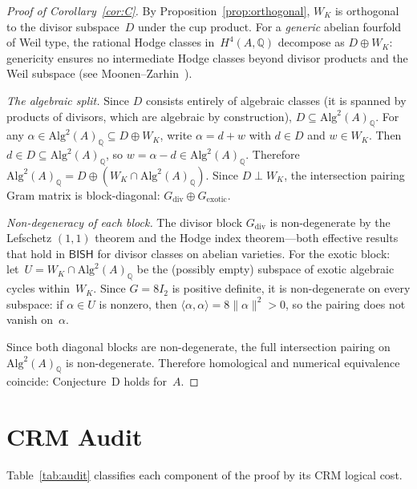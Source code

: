\documentclass[11pt]{article}
\theoremstyle{plain}
\theoremstyle{definition}
\theoremstyle{remark}
\newcommand{\Q}{\mathbb{Q}}
\newcommand{\BISH}{\mathsf{BISH}}
\begin{document}
\begin{proof}[Proof of Corollary~\ref{cor:C}]
By Proposition~\ref{prop:orthogonal}, $W_K$ is orthogonal to the divisor
subspace~$D$ under the cup product.  For a \emph{generic} abelian fourfold
of Weil type, the rational Hodge classes in~$H^4(A,\Q)$ decompose as
$D \oplus W_K$: genericity ensures no intermediate Hodge classes beyond
divisor products and the Weil subspace
(see Moonen--Zarhin~\cite{moonen-zarhin2000}).

\emph{The algebraic split.}
Since $D$ consists entirely of algebraic classes (it is spanned by products
of divisors, which are algebraic by construction), $D \subseteq
\text{Alg}^2(A)_\Q$.  For any $\alpha \in \text{Alg}^2(A)_\Q
\subseteq D \oplus W_K$, write $\alpha = d + w$ with $d \in D$ and
$w \in W_K$.  Then $d \in D \subseteq \text{Alg}^2(A)_\Q$, so
$w = \alpha - d \in \text{Alg}^2(A)_\Q$.  Therefore
$\text{Alg}^2(A)_\Q = D \oplus (W_K \cap \text{Alg}^2(A)_\Q)$.
Since $D \perp W_K$, the intersection pairing Gram matrix is
block-diagonal: $G_{\mathrm{div}} \oplus G_{\mathrm{exotic}}$.

\emph{Non-degeneracy of each block.}
The divisor block $G_{\mathrm{div}}$ is non-degenerate by the Lefschetz
$(1,1)$ theorem and the Hodge index theorem---both effective results that
hold in $\BISH$ for divisor classes on abelian varieties.
For the exotic block: let~$U = W_K \cap \text{Alg}^2(A)_\Q$ be the
(possibly empty) subspace of exotic algebraic cycles within~$W_K$.  Since
$G = 8I_2$ is positive definite, it is non-degenerate on every subspace:
if $\alpha \in U$ is nonzero, then
$\langle \alpha, \alpha \rangle = 8\|\alpha\|^2 > 0$, so the pairing does
not vanish on~$\alpha$.

Since both diagonal blocks are non-degenerate, the full intersection pairing
on~$\text{Alg}^2(A)_\Q$ is non-degenerate.  Therefore homological and
numerical equivalence coincide: Conjecture~D holds for~$A$.
\end{proof}


\section{CRM Audit}
\label{sec:audit}

Table~\ref{tab:audit} classifies each component of the proof by its CRM
logical cost.
\end{document}
